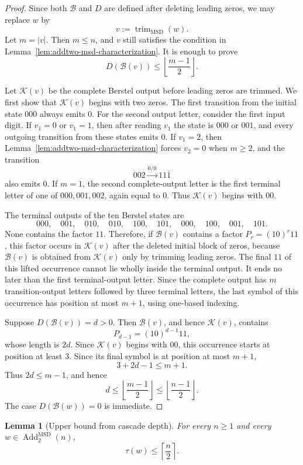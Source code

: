 \documentclass[11pt,letterpaper]{article}
\numberwithin{equation}{section}
\theoremstyle{plain}
\newtheorem{lemma}[theorem]{Lemma}
\theoremstyle{definition}
\theoremstyle{remark}
\newcommand{\AddTwo}{\operatorname{Add}_{2}}
\newcommand{\Berstel}{\mathcal{B}}
\newcommand{\trimMSD}{\operatorname{trim}_{\mathrm{MSD}}}
\begin{document}
\begin{proof}
Since both $\Berstel$ and $D$ are defined after deleting leading zeros, we may
replace $w$ by
\[
v:=\trimMSD(w).
\]
Let $m=|v|$.  Then $m\le n$, and $v$ still satisfies the condition in
Lemma~\ref{lem:addtwo-msd-characterization}.  It is enough to prove
\[
D(\Berstel(v))\le \left\lfloor\frac{m-1}{2}\right\rfloor.
\]

Let $\mathcal K(v)$ be the complete Berstel output before leading zeros are
trimmed.  We first show that $\mathcal K(v)$ begins with two zeros.  The first
transition from the initial state $000$ always emits $0$.  For the second
output letter, consider the first input digit.  If $v_1=0$ or $v_1=1$, then
after reading $v_1$ the state is $000$ or $001$, and every outgoing transition
from these states emits $0$.  If $v_1=2$, then
Lemma~\ref{lem:addtwo-msd-characterization} forces $v_2=0$ when $m\ge 2$, and
the transition
\[
002\xrightarrow{0/0}11\bar{1}
\]
also emits $0$.  If $m=1$, the second complete-output letter is the first
terminal letter of one of $000,001,002$, again equal to $0$.  Thus
$\mathcal K(v)$ begins with $00$.

The terminal outputs of the ten Berstel states are
\[
000,\quad 001,\quad 010,\quad 010,\quad 100,\quad 101,\quad
000,\quad 100,\quad 001,\quad 101.
\]
None contains the factor $11$.  Therefore, if $\Berstel(v)$ contains a factor
$P_r=(10)^r11$, this factor occurs in $\mathcal K(v)$ after the deleted initial
block of zeros, because $\Berstel(v)$ is obtained from $\mathcal K(v)$ only by
trimming leading zeros.  The final $11$ of this lifted occurrence cannot lie
wholly inside the terminal output.  It ends no later than the first
terminal-output letter.  Since the complete output has $m$ transition-output
letters followed by three terminal letters, the last symbol of this occurrence
has position at most $m+1$, using one-based indexing.

Suppose $D(\Berstel(v))=d>0$.  Then $\Berstel(v)$, and hence $\mathcal K(v)$,
contains
\[
P_{d-1}=(10)^{d-1}11,
\]
whose length is $2d$.  Since $\mathcal K(v)$ begins with $00$, this occurrence
starts at position at least $3$.  Since its final symbol is at position at
most $m+1$,
\[
3+2d-1\le m+1.
\]
Thus $2d\le m-1$, and hence
\[
d\le \left\lfloor\frac{m-1}{2}\right\rfloor
\le \left\lfloor\frac{n-1}{2}\right\rfloor.
\]
The case $D(\Berstel(w))=0$ is immediate.
\end{proof}

\begin{lemma}[Upper bound from cascade depth]\label{lem:berstel-depth-upper}
For every $n\ge 1$ and every $w\in\AddTwo^{\mathrm{MSD}}(n)$,
\[
\tau(w)\le \left\lceil\frac n2\right\rceil.
\]
\end{lemma}
\end{document}
